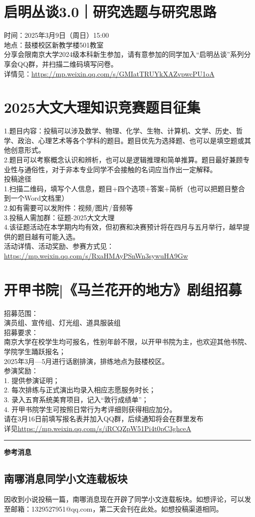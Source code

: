 \documentclass[letterpaper, 12pt]{article}
\begin{document}
\begin{multicols}{2}
\section{启明丛谈3.0｜研究选题与研究思路}
时间：2025年3月9日（周日）15:00\\
地点：鼓楼校区新教学楼501教室\\
分享会限南京大学2024级本科新生参加，请有意参加的同学加入“启明丛谈”系列分享会QQ群，并扫描二维码填写问卷。\\
详情见：\url{https://mp.weixin.qq.com/s/GMIatTRUYkXAZvpwcPU1oA}

\section{2025大文大理知识竞赛题目征集}
1.题目内容：投稿可以涉及数学、物理、化学、生物、计算机、文学、历史、哲学、政治、心理艺术等各个学科的题目。题目优先为选择题、也可以是填空题或其他创意形式。\\
2.题目可以考察概念认识和辨析，也可以是逻辑推理和简单推算。题目最好兼顾专业性与通俗性，对于非本专业同学不会接触的名词应当作出一定解释。\\
投稿途径\\
1.扫描二维码，填写个人信息，题目+四个选项+答案+简析（也可以把题目整合到一个Word文档里）\\
2.如有需要可以发附件：视频/图片/音频等\\
3.投稿人需加群：征题-2025大文大理\\
4.该征题活动在本学期内均有效，但初赛和决赛预计将在四月与五月举行，越早提供的题目越有可能入选。\\
活动详情、活动奖励、参赛方式见：\url{https://mp.weixin.qq.com/s/RxaHMAyPSnWn3sywuHA9Gw}

\section{开甲书院|《马兰花开的地方》剧组招募}
招募范围：\\
演员组、宣传组、灯光组、道具服装组\\
招募要求：\\
南京大学在校学生均可报名，性别年龄不限，以开甲书院为主，也欢迎其他书院、学院学生踊跃报名；\\
2025年3月—5月进行话剧排演，排练地点为鼓楼校区。\\
参演奖励：\\
1. 提供参演证明；\\
2. 每次排练与正式演出均录入相应志愿服务时长；\\
3. 录入五育系统美育项目，记入“敦行成绩单”；\\
4. 开甲书院学生可按照日常行为考评细则获得相应加分。\\
请在3月16日前填写报名表并加入QQ群，后续通知将会在群里发布\\
详见\url{https://mp.weixin.qq.com/s/iRCQZpW51Pi4t0pC3ghceA}
\end{multicols} 
\hrule
\vspace{4mm}
\centerline{\huge\textbf{参考消息}}
\begin{multicols}{2}
\section{南哪消息同学小文连载板块}
因收到小说投稿一篇，南哪消息现在开辟了同学小文连载板块。如想评论，可以发至邮箱：1329527951@qq.com，第二天会刊在此处。如想投稿渠道相同。

\end{multicols} 
\end{document}
